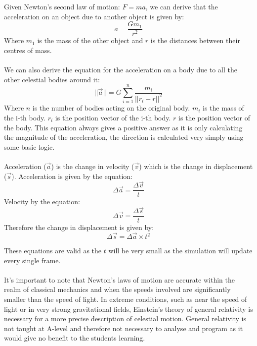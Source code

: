 \documentclass[12pt]{article}
\begin{document}
Given Newton's second law of motion: $F=ma$, we can derive that the acceleration on an object due to another object is given by:
\begin{equation}
    a = \frac{Gm_1}{r^2}
\end{equation}
Where $m_1$ is the mass of the other object and $r$ is the distances between their centres of mass.
\\\\
We can also derive the equation for the acceleration on a body due to all the other celestial bodies around it:
\begin{equation}
    ||\vec{a}|| = G\sum_{i=1}^{n}\frac{m_i}{||r_i-r||^2}
\end{equation}
Where $n$ is the number of bodies acting on the original body. $m_i$ is the mass of the i-th body. $r_i$ is the position vector of the i-th body. $r$ is the position vector of the body. This equation always gives a positive answer as it is only calculating the magnitude of the acceleration, the direction is calculated very simply using some basic logic.
\\\\
Acceleration ($\vec{a}$) is the change in velocity ($\vec{v}$) which is the change in displacement ($\vec{s}$). Acceleration is given by the equation:
\begin{equation}
    \Delta\vec{a} = \frac{\Delta\vec{v}}{t}
\end{equation}
Velocity by the equation:
\begin{equation}
    \Delta\vec{v} = \frac{\Delta\vec{s}}{t}
\end{equation}
Therefore the change in displacement is given by:
\begin{equation}
    \Delta\vec{s} = \Delta\vec{a} \times t^2
\end{equation}

These equations are valid as the $t$ will be very small as the simulation will update every single frame.
\paragraph{}
It's important to note that Newton's laws of motion are accurate within the realm of classical mechanics and when the speeds involved are significantly smaller than the speed of light. In extreme conditions, such as near the speed of light or in very strong gravitational fields, Einstein's theory of general relativity is necessary for a more precise description of celestial motion. General relativity is not taught at A-level and therefore not necessary to analyse and program as it would give no benefit to the students learning.
\end{document}
